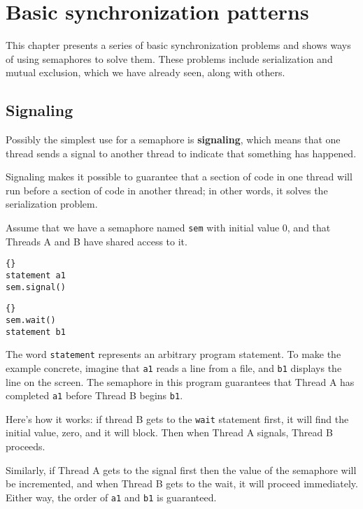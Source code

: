 \documentclass{book}
\newcommand{\clearemptydoublepage}{\newpage\cleardoublepage}
\begin{document}
\clearemptydoublepage
\chapter{Basic synchronization patterns}

This chapter presents a series of basic synchronization problems and
shows ways of using semaphores to solve them.  These problems include
serialization and mutual exclusion, which we have already seen, along
with others.

\section{Signaling}

Possibly the simplest use for a semaphore is {\bf signaling},
which means that one thread sends a signal to another
thread to indicate that something has happened.

Signaling makes it possible to guarantee
that a section of code in one thread will run before a section of
code in another thread; in other words, it solves the serialization
problem.

Assume that we have a semaphore named {\tt sem} with initial value
0, and that Threads A and B have shared access to it.

\begin{minipage}[t]{2in}
\begin{lstlisting}[title={Thread A}]{}
statement a1
sem.signal()
\end{lstlisting}
\end{minipage}
\hfill
\begin{minipage}[t]{2in}
\begin{lstlisting}[title={Thread B}]{}
sem.wait()
statement b1
\end{lstlisting}
\end{minipage}

The word {\tt statement} represents an arbitrary program statement.
To make the example concrete, imagine that {\tt a1} reads a line
from a file, and {\tt b1} displays the line on the screen.
The semaphore in this program guarantees that Thread A
has completed {\tt a1} before Thread B begins {\tt b1}.

Here's how it works: if thread B gets to the
{\tt wait} statement first, it will find the initial
value, zero, and it will block.  Then when Thread A signals,
Thread B proceeds.

Similarly, if Thread A gets to the signal first then the
value of the semaphore will be incremented, and when Thread
B gets to the wait, it will proceed immediately.
Either way, the order of {\tt a1} and {\tt b1} is guaranteed.
\end{document}
